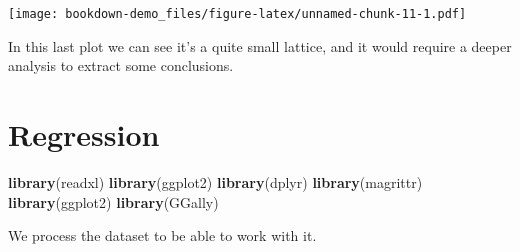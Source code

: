 \documentclass[
]{book}
\newenvironment{Shaded}{\begin{snugshade}}{\end{snugshade}}
\newcommand{\KeywordTok}[1]{\textcolor[rgb]{0.13,0.29,0.53}{\textbf{#1}}}
\newcommand{\NormalTok}[1]{#1}
\newcommand{\OperatorTok}[1]{\textcolor[rgb]{0.81,0.36,0.00}{\textbf{#1}}}
\begin{document}
\begin{Shaded}
\end{Shaded}

\texttt{[image: bookdown-demo\_files/figure-latex/unnamed-chunk-11-1.pdf]}

In this last plot we can see it's a quite small lattice, and it would require a deeper analysis to extract some conclusions.

\hypertarget{regression}{%
\chapter{Regression}\label{regression}}

\begin{Shaded}
\begin{Highlighting}[]
\KeywordTok{library}\NormalTok{(readxl)}
\KeywordTok{library}\NormalTok{(ggplot2)}
\KeywordTok{library}\NormalTok{(dplyr)}
\KeywordTok{library}\NormalTok{(magrittr)}
\KeywordTok{library}\NormalTok{(ggplot2)}
\KeywordTok{library}\NormalTok{(GGally)}
\end{Highlighting}
\end{Shaded}

We process the dataset to be able to work with it.
\end{document}
